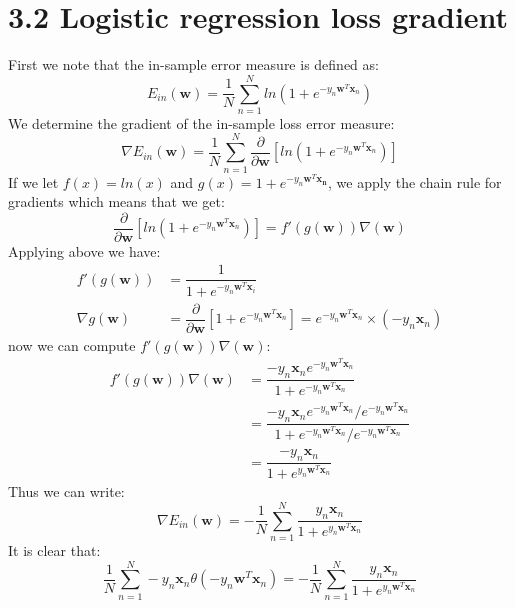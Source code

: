 \documentclass{article}
\begin{document}
\section{3.2 Logistic regression loss gradient}
First we note that the in-sample error measure is defined as:
\begin{equation*}
E_{in}(\mathbf{w}) = \dfrac{1}{N} \sum\limits_{n=1}^N ln \left(1+e^{-y_n \mathbf{w}^T \mathbf{x}_n} \right)
\end{equation*}
We determine the gradient of the in-sample loss error measure:
\begin{equation*}
\nabla E_{in}(\mathbf{w}) = \dfrac{1}{N} \sum\limits_{n=1}^N \dfrac{\partial}{\partial \mathbf{w}} \left[ ln \left(1+e^{-y_n\mathbf{w}^T\mathbf{x}_n}\right) \right]
\end{equation*}
If we let $f(x)=ln(x)$ and $g(x) = 1 + e^{-y_n \mathbf{w}^T \mathbf{x_n}}$, we apply the chain rule for gradients which means that we get:
\begin{equation*}
\dfrac{\partial}{\partial \mathbf{w}} \left[ ln \left(1+e^{-y_n\mathbf{w}^T\mathbf{x}_n}\right) \right] = f'(g(\mathbf{w}))\nabla(\mathbf{w})
\end{equation*}
Applying above we have:
\begin{align*}
f'(g(\mathbf{w})) &= \dfrac{1}{1+e^{-y_n\mathbf{w}^T\mathbf{x}_i}} \\
\nabla g(\mathbf{w}) &= \dfrac{\partial}{\partial \mathbf{w}} \left[
1+ e^{-y_n\mathbf{w}^T\mathbf{x}_n} \right] = e^{-y_n \mathbf{w}^T \mathbf{x}_n}  \times (-y_n \mathbf{x}_n) 
\end{align*}
now we can compute $f'(g(\mathbf{w}))\nabla(\mathbf{w})$:
\begin{align*}
f'(g(\mathbf{w}))\nabla(\mathbf{w}) &=
\dfrac{-y_n \mathbf{x}_n e ^{-y_n\mathbf{w}^T\mathbf{x}_n}}
{1+e^{-y_n \mathbf{w}^T \mathbf{x}_n }} \\
&= 
\dfrac{
{-y_n \mathbf{x}_n e^{-y_n\mathbf{w}^T\mathbf{x}_n}} / {e^{-y_n\mathbf{w}^T\mathbf{x}_n}} }
{1+e^{-y_n \mathbf{w}^T \mathbf{x}_n } / {e^{-y_n\mathbf{w}^T\mathbf{x}_n}}} \\
&= \dfrac{-y_n\mathbf{x}_n}{1+e^{y_n\mathbf{w}^T\mathbf{x}_n}}
\end{align*}
Thus we can write:
\begin{equation*}
\nabla E_{in} (\mathbf{w}) = - \dfrac{1}{N} \sum\limits_{n=1}^N \dfrac{y_n\mathbf{x}_n}{1+e^{y_n\mathbf{w}^T\mathbf{x}_n}}
\end{equation*}
It is clear that:
\begin{equation*}
\dfrac{1}{N} \sum\limits_{n=1}^N -y_n\mathbf{x}_n\theta(-y_n\mathbf{w}^T \mathbf{x}_n) = - \dfrac{1}{N} \sum\limits_{n=1}^N \dfrac{y_n\mathbf{x}_n}{1+e^{y_n\mathbf{w}^T\mathbf{x}_n}}
\end{equation*}
\end{document}
